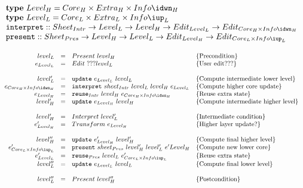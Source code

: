 \begin{small}
 \label{spec:incrementality}
\( \begin{array}{lcl}
\text{\bf type}~Level_{H}  =  Core_{H} \times Extra_{H} \times Info\idwn_{H}\\
\text{\bf type}~Level_{L}  =  Core_{L} \times Extra_{L} \times Info\iup_{L}\\
{\tt interpret}  ::  Sheet_{Intr} \rightarrow Level_{L} \rightarrow Level_{H} \rightarrow  Edit_{Level_{L}} \rightarrow Edit_{Core_{H}\times Info\idwn_{H}} \\
{\tt present}  ::  Sheet_{Pres} \rightarrow Level_{H} \rightarrow Level_{L}  \rightarrow Edit_{Level_{H}} \rightarrow Edit_{Core_{L}\times Info\iup_{L}}\\
\\
\end{array}\) \\
\( \begin{array}{rcll}  
level_{L} 	& = & Present~level_{H}						& \text{\{Precondition\}}\\
e_{Level_{L}}& = & Edit~???level_{L}							& \text{\{User edit???\}}\\
\\
level'_{L} 	& = & {\tt update}~e_{Level_{L}}~level_{L}                 & \text{\{Compute intermediate lower level\}}\\
e_{Core_{H} \times Info\idwn_{H}}  & = & {\tt interpret}~sheet_{Intr}~level_{L}~level_{H}~e_{Level_{L}} & \text{\{Compute higher core update\}}\\
e_{Level_{H}} & = & {\tt reuse}_{Intr}~level_{H}~e_{Core_{H}\times Info\idwn_{H}}     & \text{\{Reuse extra state\}}\\
level'_{H} & = & {\tt update}~e_{Level_{H}}~level_{H}                 & \text{\{Compute intermediate higher level\}}\\
\\
level'_{H} & = & Interpret~level'_{L}						& \text{\{Intermediate condition\}}\\
e'_{Level_{H}} & = & Transform~e_{Level_{H}} 			& \text{\{Higher layer update?\}}\\
\\
level''_{H} & = & {\tt update}~e'_{Level_{H}}~level'_{H}                 & \text{\{Compute final higher level\}}\\
e'_{Core_{L}\times Info\iup_{L}}  & = & {\tt present}~sheet_{Pres}~level'_{H}~level'_{L}~e'{Level_{H}} & \text{\{Compute new lower core\}}\\
e'_{Level_{L}} & = & {\tt reuse}_{Pres}~level_{L}~e'_{Core_{L}\times Info\iup_{L}} & \text{\{Reuse extra state\}}\\
level''_{L} & = & {\tt update}~e_{Level_{L}}~level_{L}                 & \text{\{Compute final lower level\}}\\
\\
level''_{L} & = & Present~level''_{H}						& \text{\{Postcondition\}}\\
\end{array}\)
\end{small}
